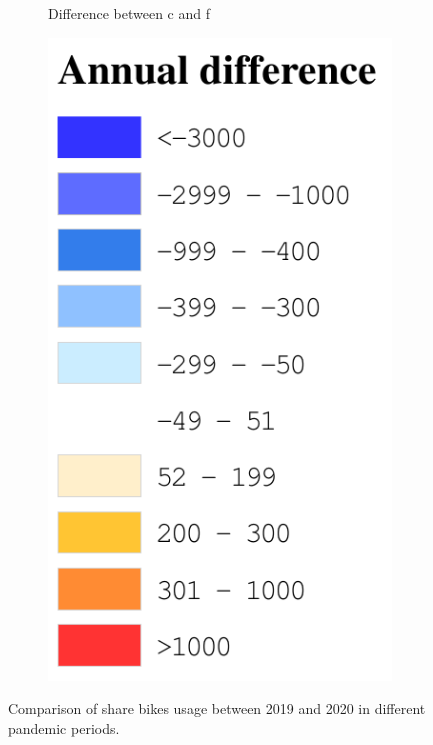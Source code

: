 \documentclass[ijgi,submit,moreauthors,pdftex]{Definitions/mdpi}
\begin{document}
\begin{figure}[!h]
\begin{subfigure}{.28\textwidth}
\begin{tikzpicture}[inner sep = 0pt]
        \end{tikzpicture}
        \caption{Difference between c and f}
        \label{fig:p_c_dif}
    \end{subfigure}
    \begin{subfigure}{.14\textwidth}
        \includegraphics[width=\textwidth]{Figures/AnnualDifLegend-eps-converted-to.pdf}
    \end{subfigure}
    \caption{Comparison of share bikes usage between 2019 and 2020 in different pandemic periods.}
    \label{fig:compare_2019_and_2020}
\end{figure}
\end{document}
